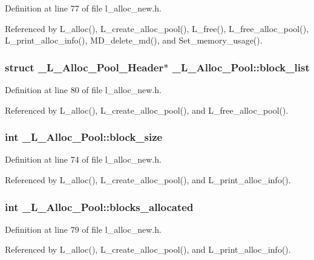 Definition at line 77 of file l\_\-alloc\_\-new.h.

Referenced by L\_\-alloc(), L\_\-create\_\-alloc\_\-pool(), L\_\-free(), L\_\-free\_\-alloc\_\-pool(), L\_\-print\_\-alloc\_\-info(), MD\_\-delete\_\-md(), and Set\_\-memory\_\-usage().
\subsubsection{\setlength{\rightskip}{0pt plus 5cm}struct \bf{\_\-L\_\-Alloc\_\-Pool\_\-Header}$\ast$ \bf{\_\-L\_\-Alloc\_\-Pool::block\_\-list}}\label{struct__L__Alloc__Pool_e631181ada29551dd6770c988139fd44}




Definition at line 80 of file l\_\-alloc\_\-new.h.

Referenced by L\_\-alloc(), L\_\-create\_\-alloc\_\-pool(), and L\_\-free\_\-alloc\_\-pool().
\subsubsection{\setlength{\rightskip}{0pt plus 5cm}int \bf{\_\-L\_\-Alloc\_\-Pool::block\_\-size}}\label{struct__L__Alloc__Pool_3cb46d0dd82acbda195ea37cc76a75c3}




Definition at line 74 of file l\_\-alloc\_\-new.h.

Referenced by L\_\-alloc(), L\_\-create\_\-alloc\_\-pool(), and L\_\-print\_\-alloc\_\-info().
\subsubsection{\setlength{\rightskip}{0pt plus 5cm}int \bf{\_\-L\_\-Alloc\_\-Pool::blocks\_\-allocated}}\label{struct__L__Alloc__Pool_34ac880dd18d2be6312015c04b7bc518}




Definition at line 79 of file l\_\-alloc\_\-new.h.

Referenced by L\_\-alloc(), L\_\-create\_\-alloc\_\-pool(), and L\_\-print\_\-alloc\_\-info().
